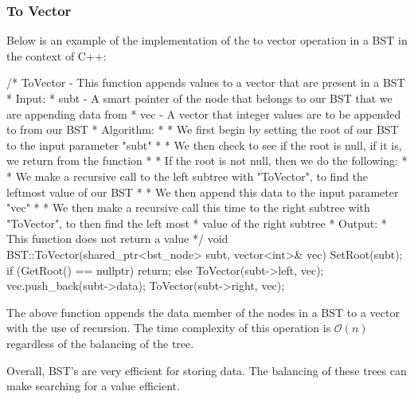 \begin{highlight}

\subsubsection*{To Vector}

Below is an example of the implementation of the to vector operation in a BST in the context of C++:

\begin{code}
/*  ToVector - This function appends values to a vector that are present in a BST
*   Input:
*     subt - A smart pointer of the node that belongs to our BST that we are appending data from
*     vec - A vector that integer values are to be appended to from our BST
*   Algorithm:
*     * We first begin by setting the root of our BST to the input parameter "subt"
*     * We then check to see if the root is null, if it is, we return from the function
*     * If the root is not null, then we do the following:
*       * We make a recursive call to the left subtree with "ToVector", to find the leftmost value of our BST
*       * We then append this data to the input parameter "vec"
*       * We then make a recursive call this time to the right subtree with "ToVector", to then find the left most
*         value of the right subtree
*   Output:
*     This function does not return a value
*/
void BST::ToVector(shared_ptr<bst_node> subt, vector<int>& vec){
    SetRoot(subt);
    if (GetRoot() == nullptr) {
        return;
    }
    else {
        ToVector(subt->left, vec);
        vec.push_back(subt->data);
        ToVector(subt->right, vec);
    }
}
\end{code}

\noindent The above function appends the data member of the nodes in a BST to a vector with the use of recursion. The time complexity of this operation is $\mathcal{O}(n)$ regardless of the balancing
of the tree.
    
\end{highlight}

Overall, BST's are very efficient for storing data. The balancing of these trees can make searching for a value efficient.

\clearpage